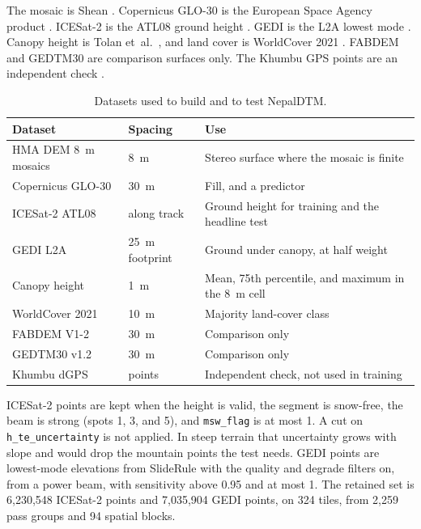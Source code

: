 \documentclass[11pt]{article}
\begin{document}
The mosaic is Shean \citep{shean2017hma}.
Copernicus GLO-30 is the European Space Agency product \citep{esa2021copernicus}.
ICESat-2 is the ATL08 ground height \citep{markus2017icesat2,neuenschwander2019atl08}.
GEDI is the L2A lowest mode \citep{dubayah2020gedi}.
Canopy height is Tolan et~al.\ \citep{tolan2024canopy}, and land cover is WorldCover 2021 \citep{zanaga2022worldcover}.
FABDEM \citep{hawker2022fabdem} and GEDTM30 \citep{ho2025gedtm30} are comparison surfaces only.
The Khumbu GPS points are an independent check \citep{quincey2016khumbu}.

\begin{table}[ht]
  \centering
  \caption{Datasets used to build and to test NepalDTM.}
  \label{tab:data}
  \small
  \begin{tabular}{@{}llp{6.2cm}@{}}
    \toprule
    Dataset & Spacing & Use \\
    \midrule
    HMA DEM 8~m mosaics & 8~m & Stereo surface where the mosaic is finite \\
    Copernicus GLO-30 & 30~m & Fill, and a predictor \\
    ICESat-2 ATL08 & along track & Ground height for training and the headline test \\
    GEDI L2A & 25~m footprint & Ground under canopy, at half weight \\
    Canopy height & 1~m & Mean, 75th percentile, and maximum in the 8~m cell \\
    WorldCover 2021 & 10~m & Majority land-cover class \\
    FABDEM V1-2 & 30~m & Comparison only \\
    GEDTM30 v1.2 & 30~m & Comparison only \\
    Khumbu dGPS & points & Independent check, not used in training \\
    \bottomrule
  \end{tabular}
\end{table}

ICESat-2 points are kept when the height is valid, the segment is snow-free, the beam is strong (spots 1, 3, and 5), and \texttt{msw\_flag} is at most 1.
A cut on \texttt{h\_te\_uncertainty} is not applied.
In steep terrain that uncertainty grows with slope and would drop the mountain points the test needs.
GEDI points are lowest-mode elevations from SlideRule with the quality and degrade filters on, from a power beam, with sensitivity above 0.95 and at most 1.
The retained set is 6,230,548 ICESat-2 points and 7,035,904 GEDI points, on 324 tiles, from 2,259 pass groups and 94 spatial blocks.
\end{document}
